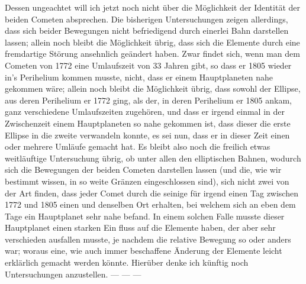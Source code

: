 \par\indent Dessen ungeachtet will ich jetzt noch nicht über die Möglichkeit der Identität der beiden Cometen
absprechen. Die bisherigen Untersuchungen zeigen allerdings, dass sich beider Bewegungen nicht
befriedigend durch einerlei Bahn darstellen lassen; allein noch bleibt die Möglichkeit übrig, dass sich
die Elemente durch eine fremdartige Störung ansehnlich geändert haben. Zwar findet sich, wenn man
dem Cometen von 1772 eine Umlaufszeit von 33 Jahren gibt, so dass er 1805 wieder in's Perihelium
kommen musste, nicht, dass er einem Hauptplaneten nahe gekommen wäre; allein noch bleibt die Möglichkeit
übrig, dass sowohl der Ellipse, aus deren Perihelium er 1772 ging, als der, in deren Perihelium er
1805 ankam, ganz verschiedene Umlaufszeiten zugehören, und dass er irgend einmal in der Zwischenzeit
einem Hauptplaneten so nahe gekommen ist, dass dieser die erste Ellipse in die zweite verwandeln konnte,
es sei nun, dass er in dieser Zeit einen oder mehrere Umläufe gemacht hat. Es bleibt also noch die
freilich etwas weitläuftige Untersuchung übrig, ob unter allen den elliptischen Bahnen, wodurch sich die
Bewegungen der beiden Cometen darstellen lassen (und die, wie wir bestimmt wissen, in so weite Gränzen
eingeschlossen sind), sich nicht zwei von der Art finden, dass jeder Comet durch die seinige für irgend
einen Tag zwischen 1772 und 1805 einen und denselben Ort erhalten, bei welchem sich an eben dem Tage
ein Hauptplanet sehr nahe befand. In einem solchen Falle musste dieser Hauptplanet einen starken Ein%
%
fluss auf die Elemente haben, der aber sehr verschieden ausfallen musste, je nachdem die relative Bewegung so oder anders war; woraus eine, wie auch immer beschaffene Änderung der Elemente leicht erklärlich gemacht werden könnte. Hierüber denke ich künftig noch Untersuchungen anzustellen. --- --- ---
